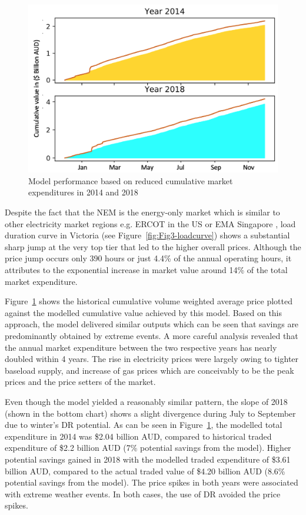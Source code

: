 \documentclass{pasa}%
\begin{document}
\begin{figure}
\begin{center}
\includegraphics[width=.9\textwidth,height=.5\textheight,keepaspectratio]{DR/PASA_example/Figures_DR/result01.png}
\caption{Model performance based on reduced cumulative market expenditures in 2014 and 2018}\label{fig:Figmodelperformance}
\end{center}
\end{figure}

Despite the fact that the NEM is the energy-only market which is similar to other electricity market regions e.g. ERCOT in the US or EMA Singapore \cite{ercot2017,ema2014}, load duration curve in Victoria (see Figure~\ref{fig:Fig3-loadcurve}) shows a substantial sharp jump at the very top tier that led to the higher overall prices. Although the price jump occurs only 390 hours or just 4.4\% of the annual operating hours, it attributes to the exponential increase in market value around 14\% of the total market expenditure.

Figure~\ref{fig:Figmodelperformance} shows the historical cumulative volume weighted average price plotted against the modelled cumulative value achieved by this model. Based on this approach, the model delivered similar outputs which can be seen that savings are predominantly obtained by extreme events. A more careful analysis revealed that the annual market expenditure between the two respective years has nearly doubled within 4 years. The rise in electricity prices were largely owing to tighter baseload supply, and increase of gas prices which are conceivably to be the peak prices and the price setters of the market.

Even though the model yielded a reasonably similar pattern, the slope of 2018 (shown in the bottom chart) shows a slight divergence during July to September due to winter's DR potential. As can be seen in Figure~\ref{fig:Figmodelperformance}, the modelled total expenditure in 2014 was \$2.04 billion AUD, compared to historical traded expenditure of \$2.2 billion AUD (7\% potential savings from the model). Higher potential savings gained in 2018 with the modelled traded expenditure of \$3.61 billion AUD, compared to the actual traded value of \$4.20 billion AUD (8.6\% potential savings from the model). The price spikes in both years were associated with extreme weather events. In both cases, the use of DR avoided the price spikes. 
\end{document}
